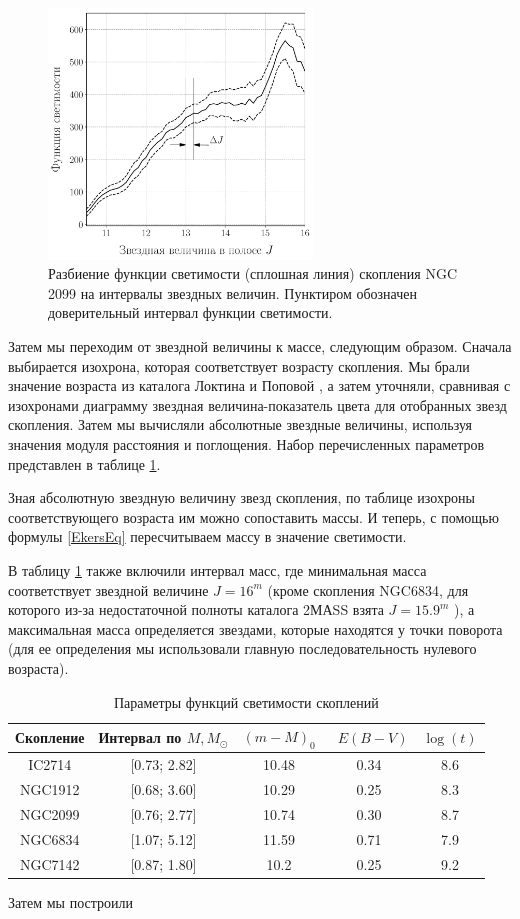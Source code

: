 \documentclass[a4paper,12pt]{article}
\begin{document}
\begin{figure}\centering
\includegraphics[width=7cm]{LF}
	\caption{Разбиение функции светимости (сплошная линия) скопления NGC 2099 на интервалы звездных величин. Пунктиром обозначен доверительный интервал функции светимости.}
	\label{LF}
\end{figure}

Затем мы переходим от звездной величины к массе, следующим образом. Сначала выбирается изохрона, которая соответствует возрасту скопления. Мы брали значение возраста из каталога Локтина и Поповой \cite{LoPo}, а затем уточняли, сравнивая с изохронами \cite{Bressan} диаграмму звездная величина-показатель цвета для отобранных звезд  скопления. Затем мы вычисляли абсолютные звездные величины, используя значения модуля расстояния и поглощения. Набор перечисленных параметров представлен в таблице \ref{clusters}. 

Зная абсолютную звездную величину звезд скопления, по таблице изохроны соответствующего возраста им можно сопоставить массы.  И теперь, с помощью формулы \ref{EkersEq} пересчитываем массу в значение светимости.

В таблицу \ref{clusters} также включили интервал масс, где минимальная масса соответствует звездной величине $J = 16^m$ (кроме скопления NGC6834, для которого из-за недостаточной полноты каталога 2МАSS взята $J = 15.9^m$ ), а максимальная масса определяется звездами, которые находятся у точки поворота (для ее определения мы использовали главную последовательность нулевого возраста).


\begin{table}[h!]
\caption{Параметры функций светимости скоплений}
\centering
		\begin{tabular}{|c|c|c|c|c|}
			\hline
				{Скопление} & {Интервал по $M, M_{\odot}$}& ${(m-M)_0}$ & \ ${E(B-V)}$ & ${\log(t)}$\\
			\hline
			IC2714 & [0.73; 2.82] & 10.48 & 0.34 & 8.6\\
			NGC1912 & [0.68;  3.60] & 10.29 & 0.25 & 8.3\\
			NGC2099 & [0.76;  2.77] & 10.74 & 0.30 & 8.7\\
			NGC6834 & [1.07;  5.12] & 11.59 & 0.71 & 7.9\\
			NGC7142 & [0.87;  1.80] & 10.2 & 0.25 & 9.2\\
			\hline
		\end{tabular}
\label{clusters}
\end{table}

 Затем мы построили 




	\newpage
	
\end{document}
